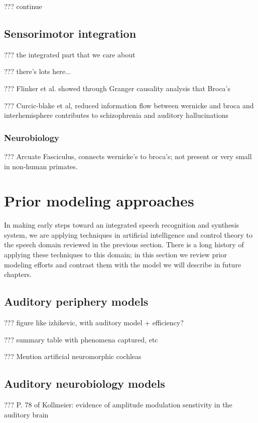 ??? continue

\subsection{Sensorimotor integration}

??? the integrated part that we care about

??? there's lots here...

??? Flinker et al.
showed through Granger causality analysis
that Broca's

??? Curcic-blake et al, reduced information flow between
wernicke and broca and interhemisphere contributes to
schizophrenia and auditory hallucinations

\subsubsection{Neurobiology}

??? Arcuate Fasciculus, connects wernicke's to broca's;
not present or very small in non-human primates.

\section{Prior modeling approaches}

In making early steps toward
an integrated speech recognition and synthesis system,
we are applying techniques
in artificial intelligence and control theory
to the speech domain reviewed in the previous section.
There is a long history of applying these techniques
to this domain;
in this section we review prior modeling efforts
and contrast them with the model we will describe
in future chapters.

\subsection{Auditory periphery models}

??? figure like izhikevic, with auditory model + efficiency?

??? summary table with phenomena captured, etc

??? Mention artificial neuromorphic cochleas

\subsection{Auditory neurobiology models}

??? P. 78 of Kollmeier: evidence of amplitude modulation senstivity
in the auditory brain

